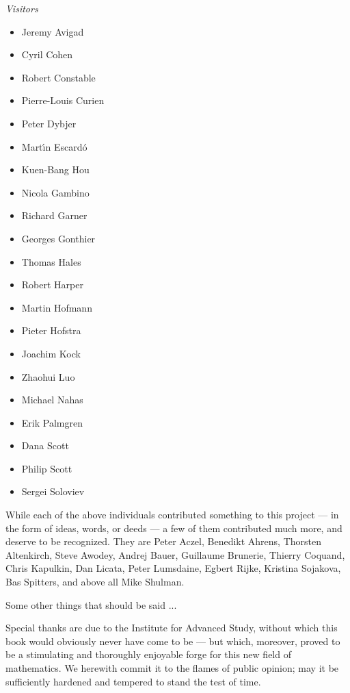 {%
\centerline{\emph{Visitors}}
%
\begin{multicols}{3}{
\begin{itemize}
\item[] Jeremy Avigad
\item[] Cyril Cohen
\item[] Robert Constable
\item[] Pierre-Louis Curien
\item[] Peter Dybjer
\item[] Mart{\'\i}n Escard{\'o}
\item[] Kuen-Bang Hou
\item[] Nicola Gambino
\item[] Richard Garner
\item[] Georges Gonthier
\item[] Thomas Hales
\item[] Robert Harper
\item[] Martin Hofmann
\item[] Pieter Hofstra
\item[] Joachim Kock
\item[] Zhaohui Luo
\item[] Michael Nahas
\item[] Erik Palmgren
\item[] Dana Scott
\item[] Philip Scott
\item[] Sergei Soloviev
\end{itemize}
}
\end{multicols}

\noindent While each of the above individuals contributed something to this project --- in the form of ideas, words, or deeds --- a few of them contributed much more, and deserve to be recognized.  They are Peter Aczel, Benedikt Ahrens, Thorsten Altenkirch,  Steve Awodey, Andrej Bauer, Guillaume Brunerie, Thierry Coquand, Chris Kapulkin, Dan Licata, Peter Lumsdaine, Egbert Rijke, Kristina Sojakova, Bas Spitters, and above all Mike Shulman.


Some other things that should be said ...

Special thanks are due to the Institute for Advanced Study, without which this book would obviously never have come to be --- but which, moreover, proved to be a stimulating and thoroughly enjoyable forge for this new field of mathematics.  We herewith commit it to the flames of public opinion; may it be sufficiently hardened and tempered to stand the test of time. 

\bigskip



}

